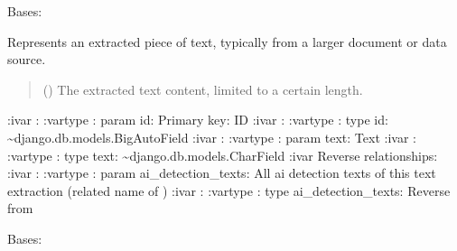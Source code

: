 \documentclass[letterpaper,10pt,english]{sphinxmanual}
\begin{document}

\begin{fulllineitems}
\label{\detokenize{source/meta_models_management:meta_models_management.models.TextExtraction}}
\pysigstartsignatures
{}
\pysigstopsignatures
\sphinxAtStartPar
Bases: 

\sphinxAtStartPar
Represents an extracted piece of text, typically from a larger document or data source.
\begin{quote}\begin{description}
\sphinxAtStartPar
{} () \textendash{} The extracted text content, limited to a certain length.

\end{description}\end{quote}

\sphinxAtStartPar
:ivar : 
:vartype : param id: Primary key: ID
:ivar : 
:vartype : type id: \textasciitilde{}django.db.models.BigAutoField
:ivar : 
:vartype : param text: Text
:ivar :
:vartype : type text: \textasciitilde{}django.db.models.CharField
:ivar Reverse relationships:
:ivar : 
:vartype : param ai\_detection\_texts: All ai detection texts of this text extraction (related name of )
:ivar : 
:vartype : type ai\_detection\_texts: Reverse  from {\hyperref[\detokenize{source/meta_models_management:meta_models_management.models.AIDetection}]{}}

\begin{fulllineitems}
\label{\detokenize{source/meta_models_management:meta_models_management.models.TextExtraction.DoesNotExist}}
\pysigstartsignatures
{}
\pysigstopsignatures
\sphinxAtStartPar
Bases: 


\end{fulllineitems}
\end{fulllineitems}
\end{document}
